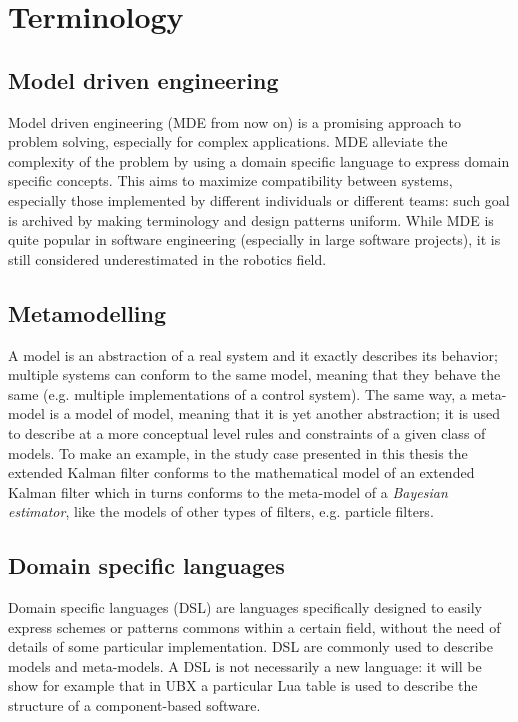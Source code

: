 \chapter{Terminology}
\label{ch:mdl}
\section{Model driven engineering}
Model driven engineering (MDE from now on) is a promising approach to problem solving, especially for complex applications. MDE alleviate the complexity of the problem by using a domain specific language to express domain specific concepts. This aims to maximize compatibility between systems, especially those implemented by different individuals or different teams: such goal is archived by making terminology and design patterns uniform.
While MDE is quite popular in software engineering (especially in large software projects), it is still considered underestimated in the robotics field.

\section{Metamodelling}
A model is an abstraction of a real system and it exactly describes its behavior; multiple systems can conform to the same model, meaning that they behave the same (e.g. multiple implementations of a control system).
The same way, a meta-model is a model of model, meaning that it is yet another abstraction; it is used to describe at a more conceptual level rules and constraints of a given class of models. To make an example, in the study case presented in this thesis the extended Kalman filter conforms to the mathematical model of an extended Kalman filter which in turns conforms to the meta-model of a \emph{Bayesian estimator}, like the models of other types of filters, e.g. particle filters.

\section{Domain specific languages}
Domain specific languages (DSL) are languages specifically designed to easily express schemes or patterns commons within a certain field, without the need of details of some particular implementation. DSL are commonly used to describe models and meta-models. A DSL is not necessarily a new language: it will be show for example that in UBX a particular Lua table is used to describe the structure of a component-based software.
